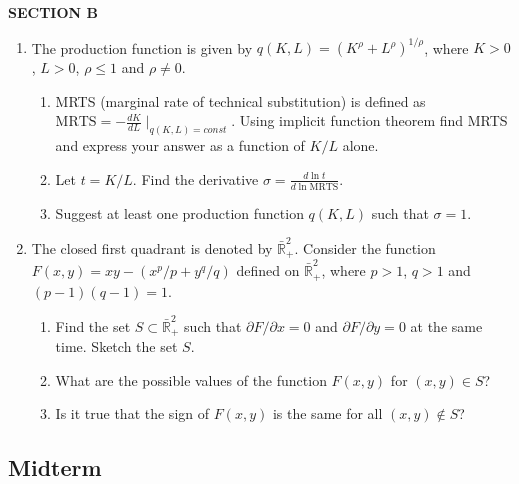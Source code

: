 \textbf{SECTION B}

\begin{enumerate}[resume]


	\item The production function is given by $q(K, L) = (K^{\rho} + L^{\rho})^{1/\rho}$, where $K>0$, $L>0$, $\rho \leq 1$ and $\rho \neq 0$.
	\begin{enumerate}
		\item MRTS (marginal rate of technical substitution) is defined as $\text{MRTS} = - \frac{dK}{dL}\mid_{q(K,L)=const}$. Using implicit function theorem find MRTS and express your answer as a function of $K/L$ alone.
		\item Let $t=K/L$. Find the derivative $\sigma = \frac{d\ln t}{d\ln \text{MRTS}}$.
		\item Suggest at least one production function $q(K,L)$ such that $\sigma = 1$.
	\end{enumerate}
\item The closed first quadrant is denoted by $\bar{\mathbb{R}}^2_+$. Consider the function $F(x, y)= xy - (x^p /p + y^q/q)$ defined on $\bar{\mathbb{R}}^2_+$, where $p>1$, $q>1$ and $(p-1)(q-1)=1$.
	\begin{enumerate}
	\item Find the set $S\subset \bar{\mathbb{R}}^2_+$ such that $\partial F/\partial x=0$ and $\partial F/\partial y =0$ at the same time. Sketch the set $S$.
	\item What are the possible values of the function $F(x,y)$ for $(x,y)\in S$?
	\item Is it true that the sign of $F(x,y)$ is the same for all $(x,y)\notin S$?
	\end{enumerate}
\end{enumerate}


\subsection{Midterm}

